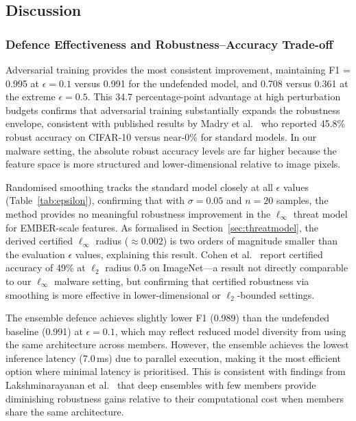 \documentclass[conference]{IEEEtran}
\begin{document}
\subsection{Discussion}

\subsubsection{Defence Effectiveness and Robustness--Accuracy Trade-off}

Adversarial training provides the most consistent improvement, maintaining F1 = 0.995 at $\epsilon = 0.1$ versus 0.991 for the undefended model, and 0.708 versus 0.361 at the extreme $\epsilon = 0.5$. This 34.7 percentage-point advantage at high perturbation budgets confirms that adversarial training substantially expands the robustness envelope, consistent with published results by Madry et al.\ \cite{madry2018} who reported 45.8\% robust accuracy on CIFAR-10 versus near-0\% for standard models. In our malware setting, the absolute robust accuracy levels are far higher because the feature space is more structured and lower-dimensional relative to image pixels.

Randomised smoothing tracks the standard model closely at all $\epsilon$ values (Table~\ref{tab:epsilon}), confirming that with $\sigma = 0.05$ and $n = 20$ samples, the method provides no meaningful robustness improvement in the $\ell_\infty$ threat model for EMBER-scale features. As formalised in Section~\ref{sec:threatmodel}, the derived certified $\ell_\infty$ radius ($\approx 0.002$) is two orders of magnitude smaller than the evaluation $\epsilon$ values, explaining this result. Cohen et al.\ \cite{cohen2019} report certified accuracy of 49\% at $\ell_2$ radius 0.5 on ImageNet---a result not directly comparable to our $\ell_\infty$ malware setting, but confirming that certified robustness via smoothing is more effective in lower-dimensional or $\ell_2$-bounded settings.

The ensemble defence achieves slightly lower F1 (0.989) than the undefended baseline (0.991) at $\epsilon = 0.1$, which may reflect reduced model diversity from using the same architecture across members. However, the ensemble achieves the lowest inference latency (7.0\,ms) due to parallel execution, making it the most efficient option where minimal latency is prioritised. This is consistent with findings from Lakshminarayanan et al.\ \cite{lakshminarayanan2017} that deep ensembles with few members provide diminishing robustness gains relative to their computational cost when members share the same architecture.
\end{document}
